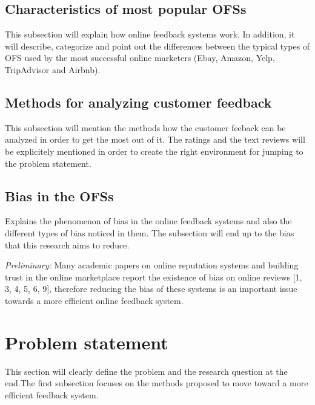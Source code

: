\subsection{Characteristics of most popular OFSs}
\label{subsec:popularOFS}

This subsection will explain how online feedback systems work. In addition, it will describe, categorize and point out the differences between the typical types of OFS used by the most successful online marketers (Ebay, Amazon, Yelp, TripAdvisor and Airbnb). 

\subsection{Methods for analyzing customer feedback}
\label{subsec:feedbackmethods}
This subsection will mention the methods how the customer feeback can be analyzed in order to get the most out of it. The ratings and the text reviews will be explicitely mentioned in order to create the right environment for jumping to the problem statement.

\subsection{Bias in the OFSs}
\label{subsec:bias}
Explains the phenomenon of bias in the online feedback systems and also the different types of bias noticed in them. The subsection will end up to the bias that this research aims to reduce.

\textit{Preliminary:} Many academic papers on online reputation systems and building trust in the online marketplace report the existence of bias on online reviews [1, 3, 4, 5, 6, 9], therefore reducing the bias of these systems is an important issue towards a more efficient online feedback system. 

\section{Problem statement}
\label{sec:problemstatement}
This section will clearly define the problem and the research question at the end.The first subsection focuses on the methods proposed to move toward a more efficient feedback system.

